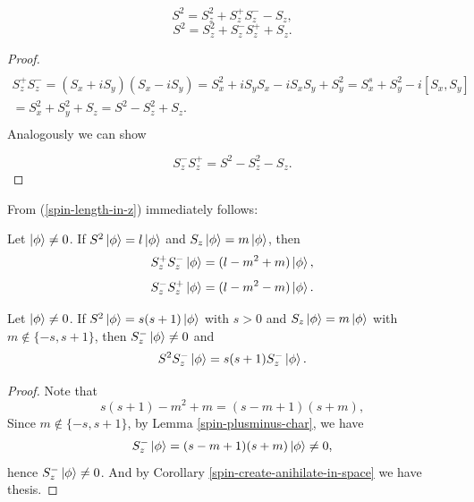 \documentclass[main.tex]{subfiles}
\begin{document}
\begin{proposition}
\label{spin-length-in-z}
\begin{equation}
S^2 = S^2_z + S_z^{+}S_z^{-} - S_z,
\end{equation}
\begin{equation}
S^2 = S^2_z + S_z^{-}S_z^{+} + S_z.
\end{equation}
\end{proposition}
\begin{proof}
\begin{multline*}
\\S^{+}_zS^{-}_z = (S_x + iS_y)(S_x - i S_y) = S^2_x + iS_y S_x - iS_x S_y + S^2_y = 
S^s_x + S^2_y - i[S_x, S_y]\\
=S^2_x + S^2_y + S_z = S^2 - S^2_z + S_z.\\
\end{multline*}
Analogously we can show

\begin{equation}
S^{-}_zS^{+}_z = S^2 - S^2_z - S_z.
\end{equation}
\end{proof}

From (\ref{spin-length-in-z}) immediately follows:

\begin{lemma}
\label{spin-plusminus-char}
Let $\ket{\phi}\not = 0$.
If $S^2\ket{\phi}= l\ket{\phi}$ and $S_z\ket{\phi} = m\ket{\phi}$, then
\begin{equation}
S_z^{+}S_z^{-}\ket{\phi} = (l - m^2 + m)\ket{\phi},
\end{equation}
\begin{equation}
S_z^{-}S_z^{+}\ket{\phi} = (l - m^2 - m)\ket{\phi}.
\end{equation}
\end{lemma}

\begin{corollary}
\label{spin-push-backward}
Let $\ket{\phi}\not = 0$.
If $S^2\ket{\phi} = s(s + 1)\ket{\phi}$ with $s > 0$ and $S_z\ket{\phi} = m\ket{\phi}$ with
$m \not\in \{-s, s + 1 \}$, then $S_z^{-}\ket{\phi} \not= 0$ and
\begin{equation}
S^2 S_z^{-}\ket{\phi} = s(s + 1)S_z^{-}\ket{\phi}.
\end{equation}
\end{corollary}
\begin{proof}
Note that
\begin{equation}
s(s+1) - m^2 + m = (s - m + 1)(s + m),
\end{equation} 
Since $m \not\in \{-s, s + 1 \}$, by Lemma \ref{spin-plusminus-char}, we have 
$$S_z^{-}\ket{\phi} = (s - m + 1)(s + m) \ket{\phi} \not= 0,$$ hence 
$S_z^{-}\ket{\phi} \not= 0$. And by Corollary \ref{spin-create-anihilate-in-space} we have thesis.
\end{proof}
\end{document}
